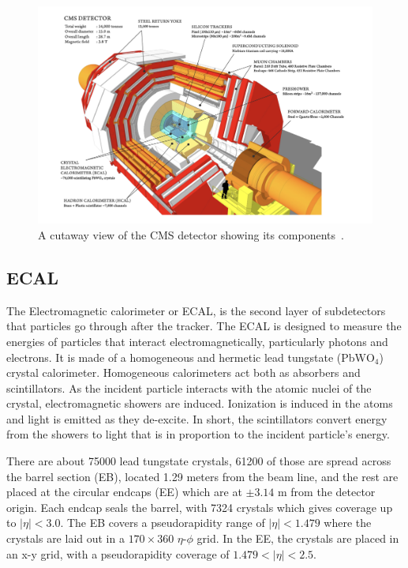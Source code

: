 \begin{figure}[htbp!]
    \caption{A cutaway view of the CMS detector showing its components~\cite{Sakuma:2013jqa}.}
    \begin{center}
        \includegraphics[scale=0.5]{fig/CutawayViewCMSDetector.png}
    \end{center}
    \label{fig:CMSdetectorCutaway}
\end{figure}

\subsection{ECAL}

The Electromagnetic calorimeter or ECAL, is the second layer of subdetectors that particles go through after the tracker. The ECAL is designed to measure the energies of particles that interact electromagnetically, particularly photons and electrons. It is made of a homogeneous and hermetic lead tungstate (PbW$\text{O}_4$) crystal calorimeter. Homogeneous calorimeters act both as absorbers and scintillators.
As the incident particle interacts with the atomic nuclei of the crystal, electromagnetic showers are induced. Ionization is induced in the atoms and light is emitted as they de-excite. In short, the scintillators convert energy from the showers to light that is in proportion to the incident particle's energy.

There are about 75000 lead tungstate crystals, 61200 of those are spread across the barrel section (EB), located 1.29 meters from the beam line, and the rest are placed at the circular endcaps (EE) which are at $\pm 3.14$ m from the detector origin. Each endcap seals the barrel, with 7324 crystals which gives coverage up to $|\eta| < 3.0$. The EB covers a pseudorapidity range of $|\eta| < 1.479$ where the crystals are laid out in a $170\times360$ $\eta$-$\phi$ grid. In the EE, the crystals are placed in an x-y grid, with a pseudorapidity coverage of $1.479 <|\eta| < 2.5$. 

